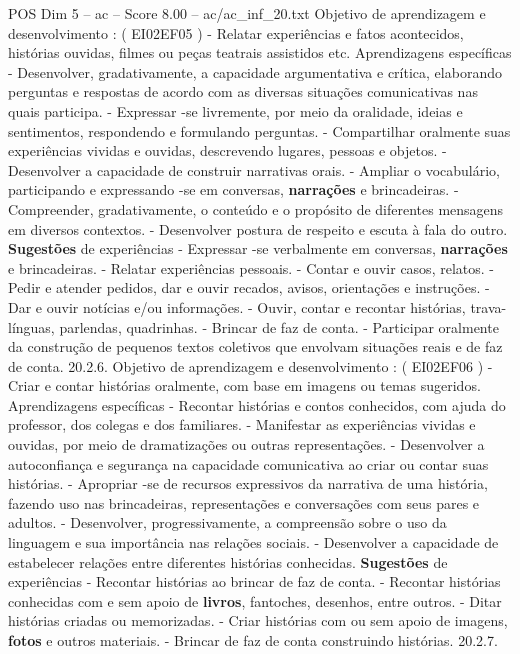 \begin{textsample}{POS Dim 5 – ac – Score 8.00 – ac/ac\_inf\_20.txt}
Objetivo de aprendizagem e desenvolvimento : ( EI02EF05 ) - Relatar experiências e fatos acontecidos, histórias ouvidas, filmes ou peças teatrais assistidos etc.
Aprendizagens específicas - Desenvolver, gradativamente, a capacidade argumentativa e crítica, elaborando perguntas e respostas de acordo com as diversas situações comunicativas nas quais participa. - Expressar -se livremente, por meio da oralidade, ideias e sentimentos, respondendo e formulando perguntas. - Compartilhar oralmente suas experiências vividas e ouvidas, descrevendo lugares, pessoas e objetos. - Desenvolver a capacidade de construir narrativas orais. - Ampliar o vocabulário, participando e expressando -se em conversas, \textbf{narrações} e brincadeiras. - Compreender, gradativamente, o conteúdo e o propósito de diferentes mensagens em diversos contextos. - Desenvolver postura de respeito e escuta à fala do outro. \textbf{Sugestões} de experiências - Expressar -se verbalmente em conversas, \textbf{narrações} e brincadeiras. - Relatar experiências pessoais. - Contar e ouvir casos, relatos. - Pedir e atender pedidos, dar e ouvir recados, avisos, orientações e instruções. - Dar e ouvir notícias e/ou informações. - Ouvir, contar e recontar histórias, trava-línguas, parlendas, quadrinhas. - Brincar de faz de conta. - Participar oralmente da construção de pequenos textos coletivos que envolvam situações reais e de faz de conta. 20.2.6.
Objetivo de aprendizagem e desenvolvimento : ( EI02EF06 ) - Criar e contar histórias oralmente, com base em imagens ou temas sugeridos.
Aprendizagens específicas - Recontar histórias e contos conhecidos, com ajuda do professor, dos colegas e dos familiares. - Manifestar as experiências vividas e ouvidas, por meio de dramatizações ou outras representações. - Desenvolver a autoconfiança e segurança na capacidade comunicativa ao criar ou contar suas histórias. - Apropriar -se de recursos expressivos da narrativa de uma história, fazendo uso nas brincadeiras, representações e conversações com seus pares e adultos. - Desenvolver, progressivamente, a compreensão sobre o uso da linguagem e sua importância nas relações sociais. - Desenvolver a capacidade de estabelecer relações entre diferentes histórias conhecidas. \textbf{Sugestões} de experiências - Recontar histórias ao brincar de faz de conta. - Recontar histórias conhecidas com e sem apoio de \textbf{livros}, fantoches, desenhos, entre outros. - Ditar histórias criadas ou memorizadas. - Criar histórias com ou sem apoio de imagens, \textbf{fotos} e outros materiais. - Brincar de faz de conta construindo histórias. 20.2.7.

\end{textsample}
